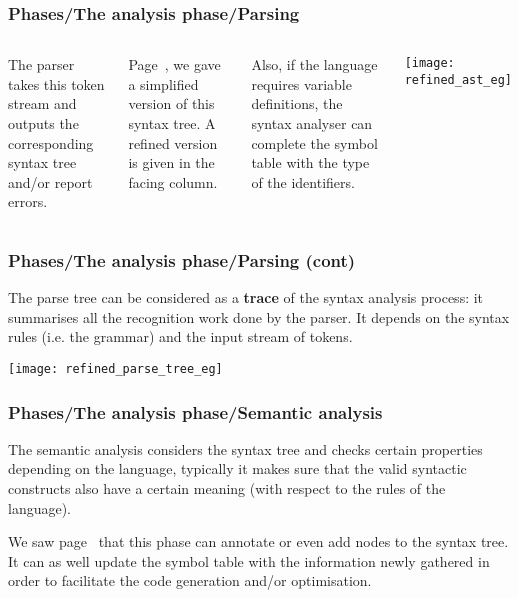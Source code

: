 % 
\begin{frame}
\frametitle{Phases/The analysis phase/Parsing}

\begin{columns}

   The parser takes this token stream and
  outputs the corresponding syntax tree and/or report errors.

  \bigskip

  Page~\pageref{ast_eg}, we gave a simplified version of this syntax
  tree. A refined version is given in the facing column.

  \bigskip

  Also, if the language requires variable definitions, the syntax
  analyser can complete the symbol table with the type of the
  identifiers.

  \begin{center}
    \texttt{[image: refined\_ast\_eg]}
  \end{center}

\end{columns}

\end{frame}

% 
\begin{frame}
\frametitle{Phases/The analysis phase/Parsing (cont)}

The parse tree can be considered as a \textbf{trace} of the syntax
analysis process: it summarises all the recognition work done by the
parser. It depends on the syntax rules (i.e. the grammar) and the
input stream of tokens. 
\begin{center}
\texttt{[image: refined\_parse\_tree\_eg]}
\end{center}

\end{frame}

% 
\begin{frame}
\frametitle{Phases/The analysis phase/Semantic analysis}

The semantic analysis considers the syntax tree and checks certain
properties depending on the language, typically it makes sure that the
valid syntactic constructs also have a certain meaning (with respect
to the rules of the language). 

\bigskip

We saw page~\pageref{annotated_ast_eg} that this phase can annotate or
even add nodes to the syntax tree. It can as well update the symbol
table with the information newly gathered in order to facilitate the
code generation and/or optimisation.

\end{frame}

